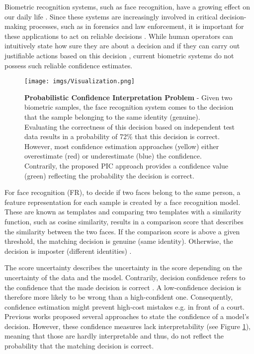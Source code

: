 \documentclass[10pt,twocolumn,letterpaper]{article}
\begin{document}
Biometric recognition systems, such as face recognition, have a growing effect on our daily life \cite{DBLP:journals/ijon/WangD21a}.
Since these systems are increasingly involved in critical decision-making processes, such as in forensics and law enforcement, it is important for these applications to act on reliable decisions \cite{DBLP:journals/corr/abs-2210-10354,neto2022explainable}.
While human operators can intuitively state how sure they are about a decision and if they can carry out justifiable actions based on this decision \cite{yeung2012metacognition}, current biometric systems do not possess such reliable confidence estimates.

\begin{figure}[th]
    \centering
    \texttt{[image: imgs/Visualization.png]}
    \caption{\textbf{Probabilistic Confidence Interpretation Problem} - Given two biometric samples, the face recognition system comes to the decision that the sample belonging to the same identity (genuine). Evaluating the correctness of this decision based on independent test data results in a probability of 72\% that this decision is correct. However, most confidence estimation approaches (yellow) either overestimate (red) or underestimate (blue) the confidence. Contrarily, the proposed PIC approach provides a confidence value (green) reflecting the probability the decision is correct. 
    }
    \label{fig:Visualization}
\end{figure}

For face recognition (FR), to decide if two faces belong to the same person, a feature representation for each sample is created by a face recognition model.
These are known as templates and comparing two templates with a similarity function, such as cosine similarity, results in a comparison score that describes the similarity between the two faces.
If the comparison score is above a given threshold, the matching decision is genuine (same identity).
Otherwise, the decision is imposter (different identities) \cite{10.5555/1952072}.



The score uncertainty describes the uncertainty in the score depending on the uncertainty of the data and the model.
Contrarily, decision confidence refers to the confidence that the made decision is correct \cite{DBLP:journals/corr/abs-2210-10354, peterson1988confidence}.
A low-confidence decision is therefore more likely to be wrong than a high-confident one.
Consequently, confidence estimation might prevent high-cost mistakes e.g. in front of a court.
Previous works proposed several approaches to state the confidence of a model's decision.
However, these confidence measures lack interpretability (see Figure \ref{fig:Visualization}), meaning that those are hardly interpretable and thus, do not reflect the probability that the matching decision is correct.
\end{document}
